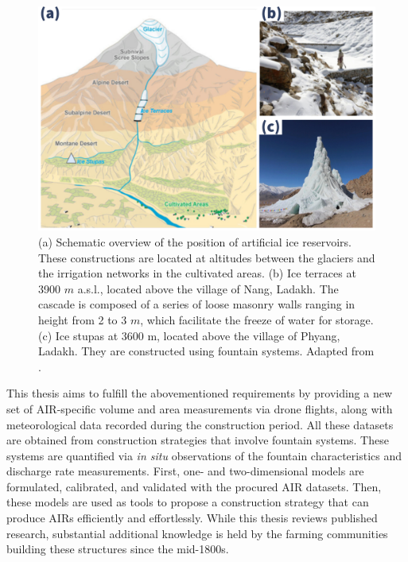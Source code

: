 \begin{figure}[t]
	\centering
	\includegraphics[width=\textwidth]{figs/AIR_forms.jpg}

	\caption{ (a) Schematic overview of the position of artificial ice reservoirs. These constructions are located at
		altitudes between the glaciers and the irrigation networks in the cultivated areas. (b) Ice terraces at 3900
		$m$ \ac{a.s.l.}, located above the village of Nang, Ladakh. The cascade is composed of a series of loose masonry walls
		ranging in height from 2 to 3 $m$, which facilitate the freeze of water for storage. (c) Ice stupas at 3600 m, located
		above the village of Phyang, Ladakh. They are constructed using fountain systems. Adapted from \citet{nusserLocalKnowledgeGlobal2016}. }

	\label{fig:AIRforms}
\end{figure}

This thesis aims to fulfill the abovementioned requirements by providing a new set of \ac{AIR}-specific volume and area
measurements via drone flights, along with meteorological data recorded during the construction period. All these
datasets are obtained from construction strategies that involve fountain systems. These systems are quantified
via \textit{in situ} observations of the fountain characteristics and discharge rate measurements. First, one- and two-dimensional models are formulated, calibrated, and validated with the procured \ac{AIR} datasets. Then,
these models are used as tools to propose a construction strategy that can produce \ac{AIRs} efficiently and
effortlessly. While this thesis reviews published research, substantial additional knowledge is held by the
farming communities building these structures since the mid-1800s.


